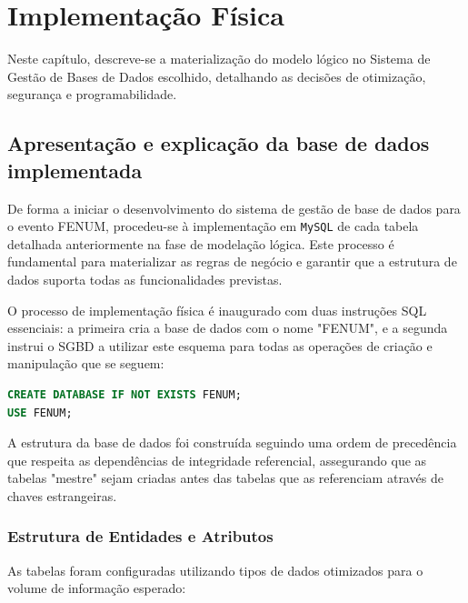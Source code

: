 \documentclass[12pt,a4paper]{article}
\begin{document}
\section{Implementação Física}

Neste capítulo, descreve-se a materialização do modelo lógico no Sistema de Gestão de Bases de Dados escolhido, detalhando as decisões de otimização, segurança e programabilidade.

\subsection{Apresentação e explicação da base de dados implementada}

De forma a iniciar o desenvolvimento do sistema de gestão de base de dados para o evento FENUM, procedeu-se à implementação em \texttt{MySQL} de cada tabela detalhada anteriormente na fase de modelação lógica. Este processo é fundamental para materializar as regras de negócio e garantir que a estrutura de dados suporta todas as funcionalidades previstas.

O processo de implementação física é inaugurado com duas instruções SQL essenciais: a primeira cria a base de dados com o nome "FENUM", e a segunda instrui o SGBD a utilizar este esquema para todas as operações de criação e manipulação que se seguem:

\begin{lstlisting}[language=SQL, caption={Instruções iniciais de criação da base de dados}, label={lst:create_db}]
CREATE DATABASE IF NOT EXISTS FENUM;
USE FENUM;
\end{lstlisting}

A estrutura da base de dados foi construída seguindo uma ordem de precedência que respeita as dependências de integridade referencial, assegurando que as tabelas "mestre" sejam criadas antes das tabelas que as referenciam através de chaves estrangeiras.

\subsubsection*{Estrutura de Entidades e Atributos}

As tabelas foram configuradas utilizando tipos de dados otimizados para o volume de informação esperado:
\end{document}
